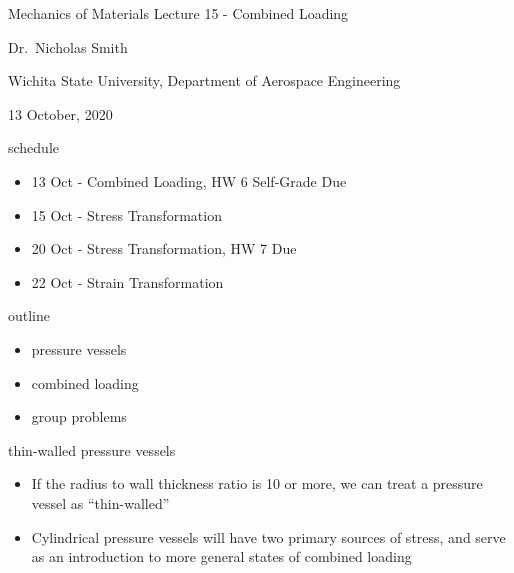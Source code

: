 \documentclass[
  letterpaper,
  ignorenonframetext,
  aspectratio=43,
  handout,
  12pt]{beamer}
\author{}
\date{}
\providecommand{\tightlist}{%
  \setlength{\itemsep}{0pt}\setlength{\parskip}{0pt}}
\providecommand{\tightlist}{%
\setlength{\itemsep}{0pt}\setlength{\parskip}{0pt}}
\begin{document}
\begin{frame}{Mechanics of Materials}
\protect\hypertarget{mechanics-of-materials}{}
Lecture 15 - Combined Loading

Dr.~Nicholas Smith

Wichita State University, Department of Aerospace Engineering

13 October, 2020
\end{frame}

\begin{frame}{schedule}
\protect\hypertarget{schedule}{}
\begin{itemize}
\tightlist
\item
  13 Oct - Combined Loading, HW 6 Self-Grade Due
\item
  15 Oct - Stress Transformation
\item
  20 Oct - Stress Transformation, HW 7 Due
\item
  22 Oct - Strain Transformation
\end{itemize}
\end{frame}

\begin{frame}{outline}
\protect\hypertarget{outline}{}
\begin{itemize}
\tightlist
\item
  pressure vessels
\item
  combined loading
\item
  group problems
\end{itemize}
\end{frame}

\begin{frame}{thin-walled pressure vessels}
\protect\hypertarget{thin-walled-pressure-vessels}{}
\begin{itemize}
\tightlist
\item
  If the radius to wall thickness ratio is 10 or more, we can treat a
  pressure vessel as ``thin-walled''
\item
  Cylindrical pressure vessels will have two primary sources of stress,
  and serve as an introduction to more general states of combined
  loading
\end{itemize}
\end{frame}
\end{document}

